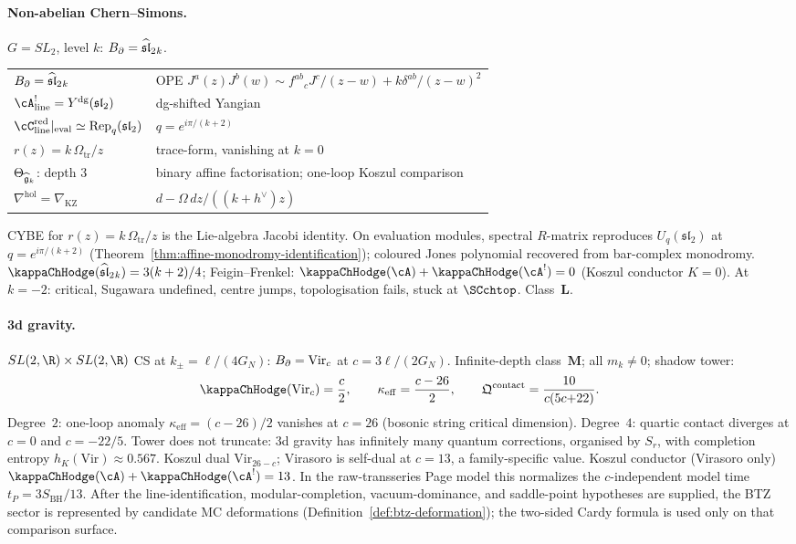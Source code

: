 \paragraph{Non-abelian Chern--Simons.}
$G = SL_2$, level $k$: $B_{\partial} = \widehat{\mathfrak{sl}}_2{}_k$.
\begin{center}
\small
\renewcommand{\arraystretch}{1.15}
\begin{tabular}{ll}
$B_{\partial} = \widehat{\mathfrak{sl}}_2{}_k$ &
 OPE $J^a(z)J^b(w) \sim f^{ab}{}_c J^c/(z{-}w) + k\delta^{ab}/(z{-}w)^2$ \\
$\cA^!_{\mathrm{line}} = \Ydg(\mathfrak{sl}_2)$ &
 dg-shifted Yangian \\
$\cC_{\mathrm{line}}^{\mathrm{red}}|_{\mathrm{eval}}
 \simeq \operatorname{Rep}_q(\mathfrak{sl}_2)$ &
 $q = e^{i\pi/(k+2)}$ \\
$r(z) = k\,\Omega_{\mathrm{tr}}/z$ & trace-form, vanishing at $k = 0$ \\
$\Theta_{\widehat{\mathfrak{g}}_k}$: depth $3$ & binary affine factorisation; one-loop Koszul comparison \\
$\nabla^{\mathrm{hol}} = \nabla_{\mathrm{KZ}}$ &
 $d - \Omega\,dz/((k+h^\vee)z)$
\end{tabular}
\end{center}
CYBE for $r(z) = k\,\Omega_{\mathrm{tr}}/z$ is the Lie-algebra Jacobi identity.
On evaluation modules, spectral $R$-matrix reproduces
$U_q(\mathfrak{sl}_2)$ at $q = e^{i\pi/(k+2)}$
(Theorem~\ref{thm:affine-monodromy-identification}); coloured
Jones polynomial recovered from bar-complex monodromy.
$\kappaChHodge(\widehat{\mathfrak{sl}}_2{}_k) = 3(k+2)/4$;
Feigin--Frenkel: $\kappaChHodge(\cA) + \kappaChHodge(\cA^!) = 0$
(Koszul conductor $K = 0$). At $k = -2$: critical, Sugawara
undefined, centre jumps, topologisation fails, stuck at
$\SCchtop$. Class~$\mathbf{L}$.

\paragraph{3d gravity.}
$SL(2,\R) \times SL(2,\R)$ CS at $k_\pm = \ell/(4G_N)$:
$B_{\partial} = \mathrm{Vir}_c$ at $c = 3\ell/(2G_N)$. Infinite-depth
class~$\mathbf{M}$; all $m_k \neq 0$; shadow tower:
\[
\kappaChHodge(\mathrm{Vir}_c) = \frac{c}{2}, \qquad
\kappa_{\mathrm{eff}} = \frac{c-26}{2}, \qquad
\mathfrak{Q}^{\mathrm{contact}} = \frac{10}{c(5c{+}22)}.
\]
Degree~$2$: one-loop anomaly $\kappa_{\mathrm{eff}} = (c-26)/2$
vanishes at $c = 26$ (bosonic string critical dimension).
Degree~$4$: quartic contact diverges at $c = 0$ and $c = -22/5$.
Tower does not truncate: 3d gravity has infinitely many quantum
corrections, organised by $S_r$, with completion entropy
$h_K(\mathrm{Vir}) \approx 0.567$. Koszul dual
$\mathrm{Vir}_{26-c}$; Virasoro is self-dual at $c = 13$, a
family-specific value. Koszul conductor (Virasoro only)
$\kappaChHodge(\cA) + \kappaChHodge(\cA^!) = 13$. In the
raw-transseries Page model this normalizes the $c$-independent
model time $t_P = 3 S_{\mathrm{BH}}/13$.
After the line-identification, modular-completion, vacuum-dominance,
and saddle-point hypotheses are supplied, the BTZ sector is represented
by candidate MC deformations (Definition~\ref{def:btz-deformation});
the two-sided Cardy formula is used only on that comparison surface.

